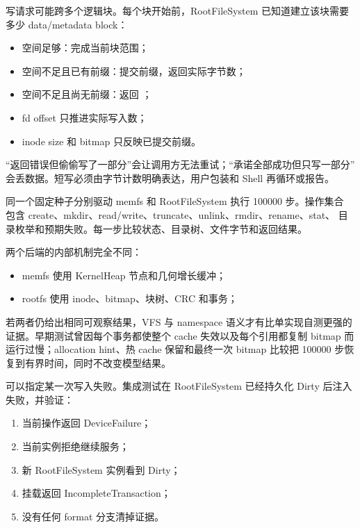 写请求可能跨多个逻辑块。每个块开始前，RootFileSystem 已知道建立该块需要
多少 data/metadata block：

\begin{itemize}
  \item 空间足够：完成当前块范围；
  \item 空间不足且已有前缀：提交前缀，返回实际字节数；
  \item 空间不足且尚无前缀：返回 ；
  \item fd offset 只推进实际写入数；
  \item inode size 和 bitmap 只反映已提交前缀。
\end{itemize}

“返回错误但偷偷写了一部分”会让调用方无法重试；“承诺全部成功但只写一部分”
会丢数据。短写必须由字节计数明确表达，用户包装和 Shell 再循环或报告。

同一个固定种子分别驱动 memfs 和 RootFileSystem 执行 100000 步。操作集合
包含 create、mkdir、read/write、truncate、unlink、rmdir、rename、stat、
目录枚举和预期失败。每一步比较状态、目录树、文件字节和返回结果。

两个后端的内部机制完全不同：

\begin{itemize}
  \item memfs 使用 KernelHeap 节点和几何增长缓冲；
  \item rootfs 使用 inode、bitmap、块树、CRC 和事务；
\end{itemize}

若两者仍给出相同可观察结果，VFS 与 namespace 语义才有比单实现自测更强的
证据。早期测试曾因每个事务都使整个 cache 失效以及每个引用都复制 bitmap
而运行过慢；allocation hint、热 cache 保留和最终一次 bitmap 比较把
100000 步恢复到有界时间，同时不改变模型结果。

 可以指定某一次写入失败。集成测试在
RootFileSystem 已经持久化 Dirty 后注入失败，并验证：

\begin{enumerate}
  \item 当前操作返回 DeviceFailure；
  \item 当前实例拒绝继续服务；
  \item 新 RootFileSystem 实例看到 Dirty；
  \item 挂载返回 IncompleteTransaction；
  \item 没有任何 format 分支清掉证据。
\end{enumerate}

